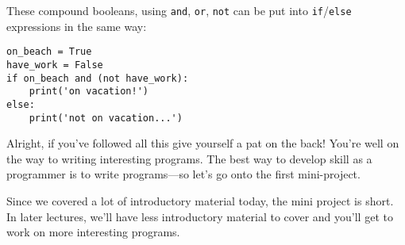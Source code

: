 These compound booleans, using \texttt{and}, \texttt{or}, \texttt{not} can be put into \texttt{if}/\texttt{else} expressions in the same way:

\begin{lstlisting}
on_beach = True
have_work = False
if on_beach and (not have_work):
	print('on vacation!')
else:
	print('not on vacation...')
\end{lstlisting}

Alright, if you’ve followed all this give yourself a pat on the back! You’re well on the way to writing interesting programs. The best way to develop skill as a programmer is to write programs---so let’s go onto the first mini-project. 

Since we covered a lot of introductory material today, the mini project is short. In later lectures, we’ll have less introductory material to cover and you’ll get to work on more interesting programs.
